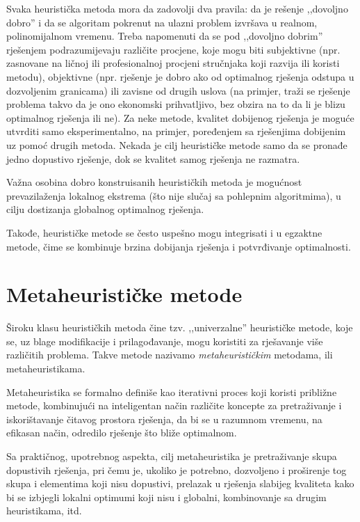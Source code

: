 \documentclass[a4paper, utf8, 11pt, colorlinks]{book}
\theoremstyle{definition}
\begin{document}
 
 Svaka heuristička metoda mora da zadovolji dva pravila: da je rešenje ,,dovoljno
 dobro'' i da se algoritam pokrenut na ulazni problem izvršava u realnom, polinomijalnom vremenu. Treba napomenuti da se pod  ,,dovoljno
 dobrim'' rješenjem podrazumijevaju različite procjene, koje mogu biti subjektivne (npr. zasnovane na ličnoj ili profesionalnoj procjeni stručnjaka koji razvija ili koristi metodu), objektivne (npr.  rješenje je dobro ako od optimalnog rješenja odstupa u dozvoljenim granicama) ili zavisne od drugih uslova (na primjer, traži se rješenje problema takvo da je ono ekonomski prihvatljivo, bez obzira na to da li je blizu optimalnog rješenja ili ne). 
 Za neke metode, kvalitet dobijenog rješenja je moguće utvrditi samo eksperimentalno, na primjer, poređenjem sa rješenjima dobijenim uz pomoć drugih metoda. Nekada je cilj heurističke metode samo da se pronađe jedno dopustivo rješenje, dok se kvalitet samog rješenja ne razmatra.
 
 Važna osobina dobro konstruisanih heurističkih metoda je mogućnost prevazilaženja lokalnog ekstrema (što nije slučaj sa pohlepnim algoritmima), u cilju dostizanja globalnog optimalnog rješenja. 
 
 Takođe, heurističke metode se često uspešno mogu integrisati i u egzaktne metode, čime se kombinuje brzina dobijanja rješenja i potvrđivanje optimalnosti.
 
 \section{Metaheurističke metode}
 
 Široku klasu heurističkih metoda čine tzv. ,,univerzalne'' heurističke metode, koje se, uz blage modifikacije i prilagođavanje, mogu koristiti za rješavanje više različitih problema. Takve metode nazivamo \emph{metaheurističkim} metodama, ili metaheuristikama.  
 
 Metaheuristika se formalno definiše kao iterativni proces koji koristi približne metode, kombinujući na inteligentan način različite koncepte za pretraživanje i iskorištavanje čitavog prostora rješenja, da bi se u razumnom vremenu, na efikasan način, odredilo rješenje što bliže optimalnom.
 
 Sa praktičnog, upotrebnog aspekta, cilj metaheuristika je pretraživanje skupa dopustivih rješenja, pri čemu je, ukoliko je potrebno, dozvoljeno i proširenje tog skupa i elementima koji nisu dopustivi, prelazak u rješenja slabijeg kvali\-teta kako bi se izbjegli lokalni optimumi koji nisu i globalni, kombinovanje sa drugim heuristikama, itd.
 
\end{document}
